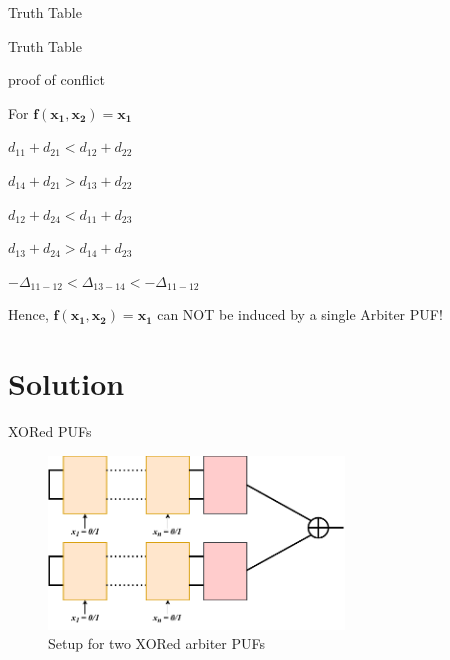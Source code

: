 \documentclass[10pt, compress]{beamer}
\begin{document}
\begin{frame}{Truth Table}
  
\end{frame}

\begin{frame}{Truth Table}
  
\end{frame}


\begin{frame}{proof of conflict}
    \begin{center}
        For $\mathbf{f(x_1, x_2) = x_1}$
        
        \vspace{0,5cm}
    
        $d_{11} + d_{21} < d_{12} + d_{22}$
        
        $d_{14} + d_{21} > d_{13} + d_{22}$
        
        $d_{12} + d_{24} < d_{11} + d_{23}$
        
        $d_{13} + d_{24} > d_{14} + d_{23}$
        
        \vspace{0.5cm}

        $-\Delta_{11-12} < \Delta_{13-14} < -\Delta_{11-12}$
        
        \vspace{0.5cm}
        
        Hence, $\mathbf{f(x_1, x_2) = x_1}$ can NOT be induced by a single Arbiter PUF!
    \end{center}
\end{frame}

\section{Solution}

\begin{frame}{XORed PUFs}
    \begin{figure}
        \centering
        \includegraphics[width=0.7\textwidth]{figures/puf_2_xor.pdf}
        \caption{Setup for two XORed arbiter PUFs}
    \end{figure}
\end{frame}
\end{document}
